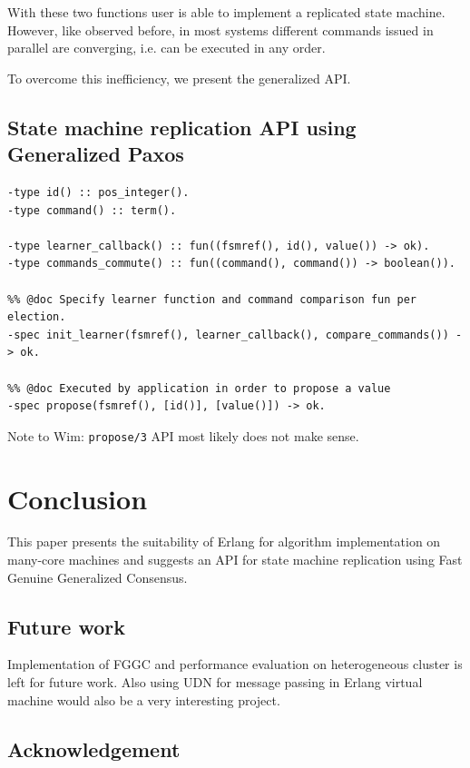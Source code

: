 \documentclass[english,11pt]{l4proj}
\newcommand{\fggc}{Fast Genuine Generalized Consensus}
\begin{document}
With these two functions user is able to implement a replicated state machine.
However, like observed before, in most systems different commands issued in
parallel are converging, i.e. can be executed in any order.

To overcome this inefficiency, we present the generalized API.

\subsection{State machine replication API using Generalized Paxos}

\begin{verbatim}
-type id() :: pos_integer().
-type command() :: term().

-type learner_callback() :: fun((fsmref(), id(), value()) -> ok).
-type commands_commute() :: fun((command(), command()) -> boolean()).

%% @doc Specify learner function and command comparison fun per election.
-spec init_learner(fsmref(), learner_callback(), compare_commands()) -> ok.

%% @doc Executed by application in order to propose a value
-spec propose(fsmref(), [id()], [value()]) -> ok.
\end{verbatim}

Note to Wim: {\tt propose/3} API most likely does not make sense.

\section{Conclusion}
\label{sec:conclusion}

This paper presents the suitability of Erlang for algorithm implementation on
many-core machines and suggests an API for state machine replication using
\fggc.

\subsection{Future work}
\label{sec:future-work}

Implementation of FGGC and performance evaluation on heterogeneous cluster is
left for future work. Also using UDN for message passing in Erlang virtual
machine would also be a very interesting project.

\subsection{Acknowledgement}
\end{document}
